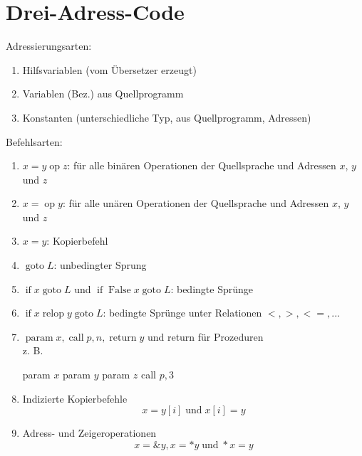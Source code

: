 \section{Drei-Adress-Code}
Adressierungsarten:
\begin{enumerate}
 \item Hilfsvariablen (vom Übersetzer erzeugt)
 \item Variablen (Bez.) aus Quellprogramm
 \item Konstanten (unterschiedliche Typ, aus Quellprogramm, Adressen)
\end{enumerate}
Befehlsarten:
\begin{enumerate}
 \item $x = y \operatorname{op} z$: für alle binären Operationen der Quellsprache und Adressen $x$, $y$ und $z$
 \item $x = \operatorname{op} y$: für alle unären Operationen der Quellsprache und Adressen $x$, $y$ und $z$
 \item $x = y$: Kopierbefehl
 \item $\operatorname{goto} L$: unbedingter Sprung
 \item $\operatorname{if} x \operatorname{goto} L$ und $\operatorname{if} \operatorname{False} x \operatorname{goto} L$: bedingte Sprünge
 \item $\operatorname{if} x \operatorname{relop} y \operatorname{goto} L$: bedingte Sprünge unter Relationen $<, >, <=, ...$
 \item $\operatorname{param} x, \operatorname{call} p, n, \operatorname{return} y$ und return für Prozeduren\\
          z. B.
          \begin{algorithmic}
           \STATE param $x$
           \STATE param $y$
           \STATE param $z$
           \STATE call $p, 3$
          \end{algorithmic}
 \item Indizierte Kopierbefehle
     \[x = y[i] \operatorname{und} x[i] = y\]
 \item Adress- und Zeigeroperationen
     \[x = \&y, x = *y \operatorname{und} *x = y\]
\end{enumerate}


